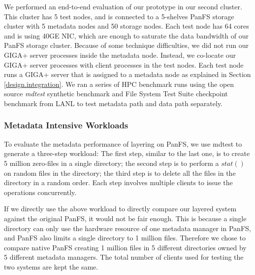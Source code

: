 We performed an end-to-end evaluation of our prototype in our second cluster.
This cluster has 5 test nodes, and is connected to
a 5-shelves PanFS storage cluster with 5 metadata nodes and 50 storage nodes.
Each test node has 64 cores and is using 40GE NIC, which are enough
to saturate the data bandwidth of our PanFS storage cluster.
Because of some technique difficulties,
we did not run our GIGA+ server processes inside the metadata node.
Instead, we co-locate our GIGA+ server processes
with client processes in the test nodes.
Each test node runs a GIGA+ server that is assigned to a metadata node
as explained in Section \ref{design.integration}.
We ran a series of HPC benchmark runs using the open source \textit{mdtest}
synthetic benchmark \cite{mdtest}
and File System Test Suite checkpoint benchmark from LANL \cite{mpiio}
to test metadata path and data path separately.

\subsubsection*{Metadata Intensive Workloads}
To evaluate the metadata performance of layering on PanFS,
we use mdtest to generate a three-step workload:
The first step, similar to the last one, is to create 5 million
zero-files in a single directory;
the second step is to perform a $stat()$ on random files in the directory;
the third step is to delete all the files in the directory in a random order.
Each step involves multiple clients to issue the operations concurrently.

If we directly use the above workload to directly compare our layered system
against the original PanFS, it would not be fair enough.
This is because a single directory can only use the hardware resource
of one metadata manager in PanFS,
and PanFS also limits a single directory to 1 million files.
Therefore we chose to compare native PanFS creating 1 million files
in 5 different directories owned by 5 different metadata managers.
The total number of clients used for testing the two systems
are kept the same.


